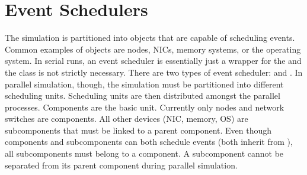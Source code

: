 \section{Event Schedulers}
\label{sec:eventSchedulers}
The simulation is partitioned into objects that are capable of scheduling events.
Common examples of \evscheduler objects are nodes, NICs, memory systems, or the operating system.
In serial runs, an event scheduler is essentially just a wrapper for the \evmgr and the class is not strictly necessary.
There are two types of event scheduler:  and .
In parallel simulation, though, the simulation must be partitioned into different scheduling units.
Scheduling units are then distributed amongst the parallel processes.
Components are the basic unit.  Currently only nodes and network switches are components.
All other devices (NIC, memory, OS) are subcomponents that must be linked to a parent component.
Even though components and subcomponents can both schedule events (both inherit from \evscheduler),
all subcomponents must belong to a component.  A subcomponent cannot be separated from its parent component during parallel simulation.



